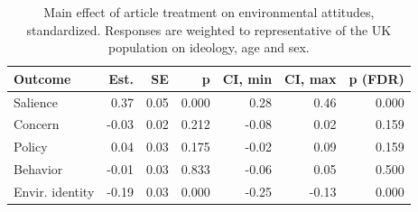 \begin{table}[h!t]
\centering
\begin{tabular}{lrrrrrr}
  \hline
Outcome & Est. & SE & p & CI, min & CI, max & p (FDR) \\ 
  \hline
Salience & 0.37 & 0.05 & 0.000 & 0.28 & 0.46 & 0.000 \\ 
  Concern & -0.03 & 0.02 & 0.212 & -0.08 & 0.02 & 0.159 \\ 
  Policy & 0.04 & 0.03 & 0.175 & -0.02 & 0.09 & 0.159 \\ 
  Behavior & -0.01 & 0.03 & 0.833 & -0.06 & 0.05 & 0.500 \\ 
  Envir. identity & -0.19 & 0.03 & 0.000 & -0.25 & -0.13 & 0.000 \\ 
   \hline
\end{tabular}
\caption{Main effect of article treatment on environmental attitudes, standardized.
                   Responses are weighted to representative of the UK population on ideology, age and sex.} 
\label{tab:main_demweights}
\end{table}
